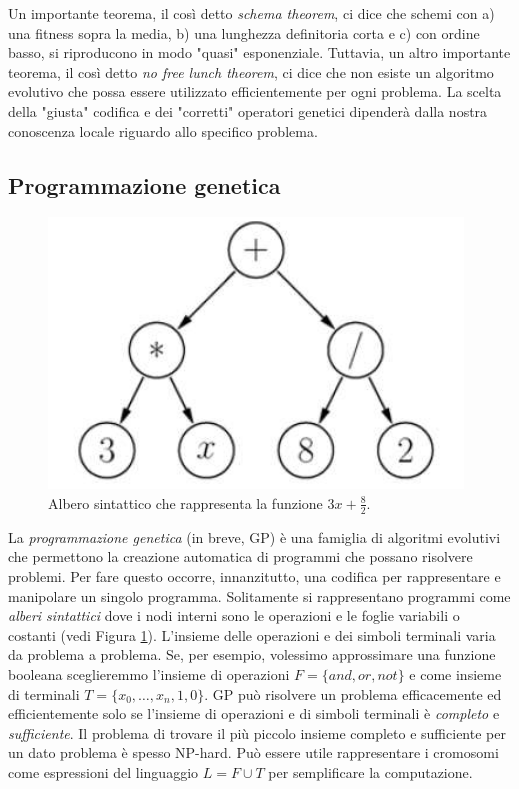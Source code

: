\documentclass[10pt,a4paper]{article}
\begin{document}
Un importante teorema, il così detto \emph{schema theorem}, ci dice che schemi con a) una fitness sopra la media, b) una lunghezza definitoria corta e c) con ordine basso, si riproducono in modo "quasi" esponenziale. Tuttavia, un altro importante teorema, il così detto \emph{no free lunch theorem}, ci dice che non esiste un algoritmo evolutivo che possa essere utilizzato efficientemente per ogni problema. La scelta della "giusta" codifica e dei "corretti" operatori genetici dipenderà dalla nostra conoscenza locale riguardo allo specifico problema.

\subsection{Programmazione genetica}


\begin{figure}
\centering
\includegraphics[scale=0.3]{img/parsetree.png}
\caption{Albero sintattico che rappresenta la funzione $3x + \frac{8}{2}$.}
\label{fig:37}
\end{figure}

La \emph{programmazione genetica} (in breve, GP) è una famiglia di algoritmi evolutivi che permettono la creazione automatica di programmi che possano risolvere problemi. Per fare questo occorre, innanzitutto, una codifica per rappresentare e manipolare un singolo programma. Solitamente si rappresentano programmi come \emph{alberi sintattici} dove i nodi interni sono le operazioni e le foglie variabili o costanti (vedi Figura \ref{fig:37}). L'insieme delle operazioni e dei simboli terminali varia da problema a problema. Se, per esempio, volessimo approssimare una funzione booleana sceglieremmo l'insieme di operazioni $F = \{and, or, not\}$ e come insieme di terminali $T = \{ x_0, \dots, x_n, 1, 0 \}$. GP può risolvere un problema efficacemente ed efficientemente solo se l'insieme di operazioni e di simboli terminali è \emph{completo} e \emph{sufficiente}. Il problema di trovare il più piccolo insieme completo e sufficiente per un dato problema è spesso NP-hard. Può essere utile rappresentare i cromosomi come espressioni del linguaggio $L = F \cup T$ per semplificare la computazione. 
\end{document}
